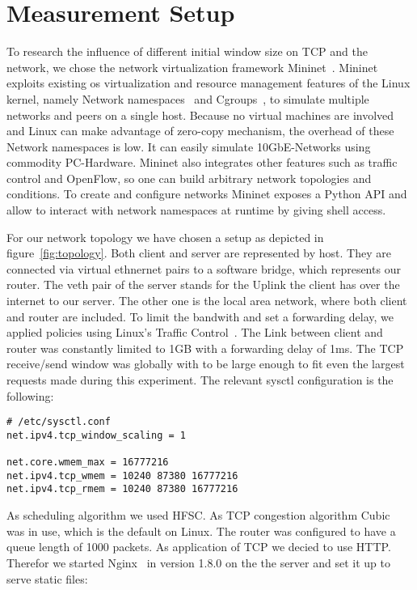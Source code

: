 \section{Measurement Setup}
\label{sec:measurement_setup}

To research the influence of different initial window size on TCP and the
network, we chose the network virtualization framework Mininet~\cite{mininet}.
Mininet exploits existing os virtualization and resource management features of
the Linux kernel, namely Network namespaces~\cite{network_namespaces} and
Cgroups~\cite{cgroups}, to simulate multiple networks and peers on a single
host. Because no virtual machines are involved and Linux can make advantage of
zero-copy mechanism, the overhead of these Network namespaces is low. It can
easily simulate 10GbE-Networks using commodity PC-Hardware. Mininet also
integrates other features such as traffic control and OpenFlow, so one can build
arbitrary network topologies and conditions. To create and configure networks
Mininet exposes a Python API and allow to interact with network namespaces at
runtime by giving shell access.



For our network topology we have chosen a setup as depicted in figure~\ref{fig:topology}.
Both client and server are represented by host. They are connected via virtual
ethnernet pairs to a software bridge, which represents our router. The veth pair
of the server stands for the Uplink the client has over the internet to our
server. The other one is the local area network, where both client and router
are included. To limit the bandwith and set a forwarding delay, we applied
policies using Linux's Traffic Control~\cite{tc}. The Link between client and
router was constantly limited to 1GB with a forwarding delay of 1ms. The TCP
receive/send window was globally with to be large enough to fit even the largest
requests made during this experiment. The relevant sysctl configuration is the
following:

\begin{lstlisting}
# /etc/sysctl.conf
net.ipv4.tcp_window_scaling = 1

net.core.wmem_max = 16777216
net.ipv4.tcp_wmem = 10240 87380 16777216
net.ipv4.tcp_rmem = 10240 87380 16777216
\end{lstlisting}

As scheduling algorithm we used HFSC. As TCP congestion algorithm
Cubic~\cite{cubic} was in use, which is the default on Linux. The router was
configured to have a queue length of 1000 packets. As application of TCP we
decied to use HTTP. Therefor we started Nginx~\cite{nginx} in version 1.8.0 on
the the server and set it up to serve static files:

